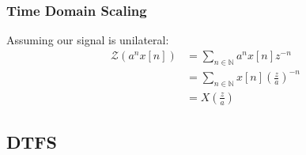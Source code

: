\subsubsection{Time Domain Scaling}
Assuming our signal is unilateral:
\begin{equation}
  \begin{aligned}
    \mathcal{Z}\left(a^n x[n] \right) &= \sum_{n \in \mathbb{N}} a^n x[n] z^{-n} \\
    &= \sum_{n \in \mathbb{N}} x[n] \left(\frac{z}{a}\right)^{-n} \\
    &= X\left( \frac{z}{a} \right)
  \end{aligned}
\end{equation}


\subsection{DTFS}
